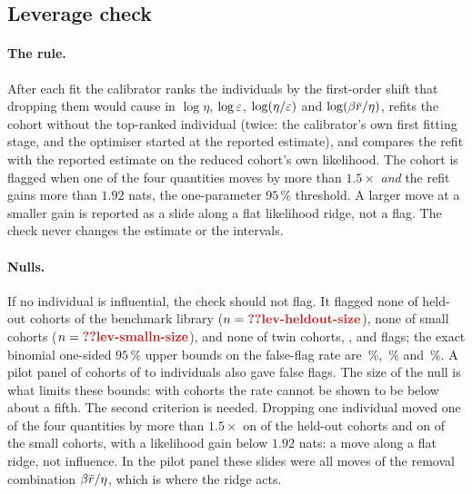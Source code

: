 \subsection{Leverage check}\label{sec:val-leverage}

\paragraph{The rule.} After each fit the calibrator ranks the individuals by the first-order shift that dropping them would
cause in $\log\eta$, $\log\varepsilon$, $\log(\eta/\varepsilon)$ and $\log(\beta\bar r/\eta)$, refits the cohort without the top-ranked individual
(twice: the calibrator's own first fitting stage, and the optimiser started at the reported estimate), and compares the
refit with the reported estimate on the reduced cohort's own likelihood. The cohort is flagged when one of the four quantities
moves by more than $1.5\times$ \emph{and} the refit gains more than $1.92$ nats, the one-parameter $95\,\%$ threshold. A
larger move at a smaller gain is reported as a slide along a flat likelihood ridge, not a flag. The check never changes the
estimate or the intervals. %

\paragraph{Nulls.} If no individual is influential, the check should not flag. It flagged none of 
held-out cohorts of the benchmark library ($n=\C{lev-heldout-size}$), none of  small cohorts ($n=\C{lev-smalln-size}$),
and none of  twin cohorts, ,  and
 flags; the exact binomial one-sided $95\,\%$ upper bounds on the false-flag rate are
\,\%, \,\% and \,\%. A pilot panel of  cohorts of  to
 individuals also gave  false flags. The size of the null is what limits these bounds: with
 cohorts the rate cannot be shown to be below about a fifth. The second criterion is
needed. Dropping one individual moved one of the four quantities by more than $1.5\times$ on  of the
 held-out cohorts and on  of the  small cohorts, with a likelihood gain below $1.92$ nats: a move along a flat ridge, not influence. In the pilot panel these slides were all
moves of the removal combination $\beta\bar r/\eta$, which is where the ridge acts.%

